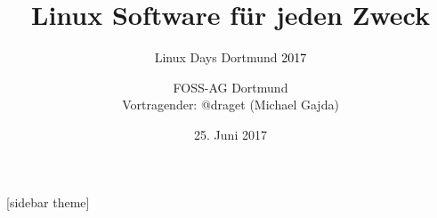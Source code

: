 \documentclass{beamer}
\author{
  FOSS-AG Dortmund \\
  Vortragender: @draget (Michael Gajda)
}
\date{25. Juni 2017}
\title{Linux Software für jeden Zweck}
\subtitle{Linux Days Dortmund \textcolor{black}{2017}}
\begin{document}
\begin{frame}
    \titlepage
\end{frame}



[sidebar theme]
\makeatletter

%














\end{document}
